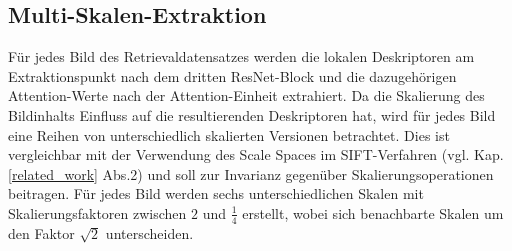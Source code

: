 \subsection{Multi-Skalen-Extraktion}
Für jedes Bild des Retrievaldatensatzes werden die lokalen Deskriptoren am Extraktionspunkt nach dem dritten ResNet-Block und die dazugehörigen Attention-Werte nach der Attention-Einheit extrahiert. Da die Skalierung des Bildinhalts Einfluss auf die resultierenden Deskriptoren hat, wird für jedes Bild eine Reihen von unterschiedlich skalierten Versionen betrachtet. Dies ist vergleichbar mit der Verwendung des Scale Spaces im SIFT-Verfahren (vgl. Kap.\ref{related_work} Abs.2) und soll zur Invarianz gegenüber Skalierungsoperationen beitragen. Für jedes Bild werden sechs unterschiedlichen Skalen mit Skalierungsfaktoren zwischen $2$ und $\frac{1}{4}$ erstellt, wobei sich benachbarte Skalen um den Faktor $\sqrt{2}$ unterscheiden. 
